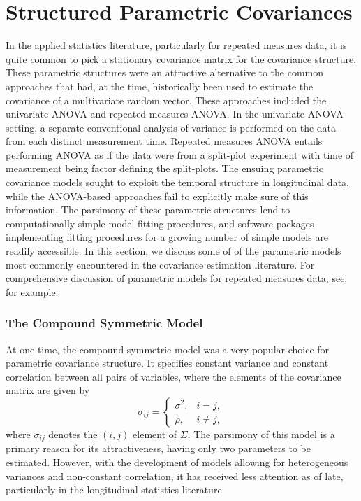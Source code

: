 


\section{Structured Parametric Covariances} \label{chapter-1-parametric-covariance-models}


In the applied statistics literature, particularly for repeated measures data, it is quite common to pick a stationary covariance matrix for the covariance structure. These parametric structures were an attractive alternative to the common approaches that had, at the time, historically been used to estimate the covariance of a multivariate random vector. These approaches included the univariate ANOVA and repeated measures ANOVA. In the univariate ANOVA setting, a separate conventional analysis of variance is performed on the data from each distinct measurement time. Repeated measures ANOVA entails performing ANOVA as if the data were from a split-plot experiment with time of measurement being factor defining the split-plots.  The ensuing parametric covariance models sought to exploit the temporal structure in longitudinal data, while the ANOVA-based approaches fail to explicitly make sure of this information. The parsimony of these parametric structures lend to computationally simple model fitting procedures, and software packages implementing fitting procedures for a growing number of simple models are readily accessible. In this section, we discuss some of of the parametric models most commonly encountered in the covariance estimation literature. For comprehensive discussion of parametric models for repeated measures data, see\cite{jennrich1986unbalanced}, for example. 

\subsubsection{The Compound Symmetric Model}

At one time, the compound symmetric model was a very popular choice for parametric covariance structure. It specifies constant variance and constant correlation between all pairs of variables, where the elements of the covariance matrix are given by
\begin{equation}\label{eq:compound-symmetric-model}
\sigma_{ij} = \left\{ \begin{array}{lr}
\sigma^2, & i = j, \\
\rho, & i \ne j,
\end{array}\right.
\end{equation}
\noindent
where $\sigma_{ij}$ denotes the $\left(i,j\right)$ element of $\Sigma$. The parsimony of this model is a primary reason for its attractiveness, having only two parameters to be estimated. However, with the development of models allowing for heterogeneous variances and non-constant correlation, it has received less attention as of late, particularly in the longitudinal statistics literature. 

